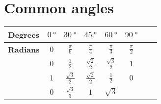 \section*{Common angles}


\begin{table}[!ht]
\setlength{\tabcolsep}{1em} %
\centering
  \tabulinesep=1.5mm
  \begin{tabu}{|c|c|c|c|c|c|c|c|}
    \hline
    \textbf{Degrees}
      & $\SI{0}{\degree}$
      & $\SI{30}{\degree}$
      & $\SI{45}{\degree}$
      & $\SI{60}{\degree}$
      & $\SI{90}{\degree}$\\
    \hline
    \textbf{Radians}
      & $\displaystyle 0$
      & $\displaystyle \frac{\pi}{6}$
      & $\displaystyle \frac{\pi}{4}$
      & $\displaystyle \frac{\pi}{3}$
      & $\displaystyle \frac{\pi}{2}$\\
    \hline
    \textbf{\bm{$\sin \theta$}}
      & $\displaystyle 0$
      & $\displaystyle \frac{1}{2}$
      & $\displaystyle \frac{\sqrt 2}{2}$
      & $\displaystyle \frac{\sqrt 3}{2}$
      & $\displaystyle 1$\\
    \hline
    \textbf{\bm{$\cos \theta$}}
      & $\displaystyle 1$
      & $\displaystyle \frac{\sqrt 3}{2}$
      & $\displaystyle \frac{\sqrt 2}{2}$
      & $\displaystyle \frac{1}{2}$
      & $\displaystyle 0$\\
    \hline
    \textbf{\bm{$\tan \theta$}}
      & $\displaystyle 0$
      & $\displaystyle \frac{\sqrt 3}{3}$
      & $\displaystyle 1$
      & $\displaystyle \sqrt 3$
      &\\
    \hline
  \end{tabu}
\end{table}